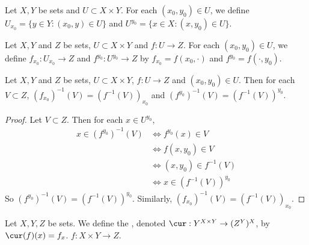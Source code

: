 \documentclass{book}
\begin{document}
	\begin{defn}   
		Let $X, Y$ be sets and $U \subset X \times Y$. For each $(x_0, y_0) \in U$, we define $U_{x_0} = \{y \in Y: (x_0,y) \in U\}$ and $U^{y_0} = \{x \in X: (x,y_0) \in U\}$.
	\end{defn}

	\begin{defn}   
		Let $X, Y$ and $Z$ be sets, $U \subset X \times Y$ and $f: U \rightarrow Z$. For each $(x_0, y_0) \in U$, we define $f_{x_0}: U_{x_0} \rightarrow Z$ and $f^{y_0}: U^{y_0} \rightarrow Z$ by $f_{x_0} = f(x_0, \cdot)$ and $f^{y_0} = f(\cdot, y_0)$.
	\end{defn}
	
	\begin{ex} 
		Let $X, Y$ and $Z$ be sets, $U \subset X \times Y$, $f: U \rightarrow Z$ and $(x_0, y_0) \in U$. Then for each $V \subset Z$, $(f_{x_0})^{-1}(V) = (f^{-1}(V))_{x_0}$ and $(f^{y_0})^{-1}(V) = (f^{-1}(V))^{y_0}$.
	\end{ex}

	\begin{proof}
		Let $V \subset Z$. Then for each $x \in U^{y_0}$,
		\begin{align*}
			x \in (f^{y_0})^{-1}(V) 
			& \iff f^{y_0}(x) \in V \\
			& \iff f(x, y_0) \in V \\
			& \iff (x, y_0) \in f^{-1}(V) \\
			& \iff x \in (f^{-1}(V))^{y_0}
		\end{align*}
		So $(f^{y_0})^{-1}(V) = (f^{-1}(V))^{y_0}$. Similarly, $(f_{x_0})^{-1}(V) = (f^{-1}(V))_{x_0}$. 
	\end{proof}
	
	\begin{defn}
		Let $X, Y, Z$ be sets. We define the , denoted $\cur: Y^{X \times Y} \rightarrow (Z^Y)^X$, by 
		$\cur(f)(x) = f_x$.  $f: X \times Y \rightarrow Z$.
	\end{defn}
	
	
	
	
	
	
	
	
	
	
	
	
	
	
	
	
	
	
	
	
	
\end{document}
